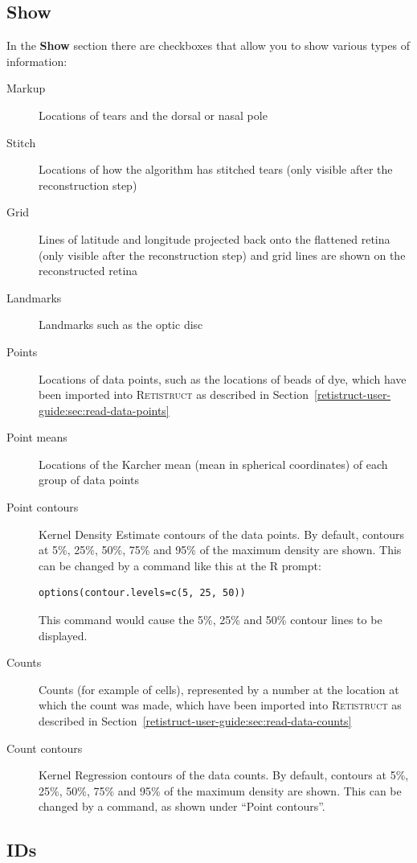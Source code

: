 \documentclass{book}
\begin{document}
\subsection{Show} In the \textbf{Show} section there are checkboxes
that allow you to show various types of information:
\begin{description}
\item[Markup] Locations of tears and the dorsal or nasal pole
\item[Stitch] Locations of how the algorithm has stitched tears (only
  visible after the reconstruction step)
\item[Grid] Lines of latitude and longitude projected back onto the
  flattened retina (only visible after the reconstruction step) and
  grid lines are shown on the reconstructed retina
\item[Landmarks] Landmarks such as the optic disc
\item[Points] Locations of data points, such as the locations of beads
  of dye, which have been imported into \textsc{Retistruct} as
  described in Section~\ref{retistruct-user-guide:sec:read-data-points}
\item[Point means] Locations of the Karcher mean (mean in spherical
  coordinates) of each group of data points
\item[Point contours] Kernel Density Estimate contours of the data
  points. By default, contours at 5\%, 25\%, 50\%, 75\% and 95\% of
  the maximum density are shown. This can be changed by a command like
  this at the R prompt:
\begin{verbatim}
options(contour.levels=c(5, 25, 50))
\end{verbatim}
  This command would cause the 5\%, 25\% and 50\% contour lines to be
  displayed.
\item[Counts] Counts (for example of cells), represented by a number
  at the location at which the count was made, which have been
  imported into \textsc{Retistruct} as described in
  Section~\ref{retistruct-user-guide:sec:read-data-counts}
\item[Count contours] Kernel Regression contours of the data counts.
  By default, contours at 5\%, 25\%, 50\%, 75\% and 95\% of the
  maximum density are shown. This can be changed by a command, as
  shown under ``Point contours''.
\end{description}

\subsection{IDs}
\end{document}
